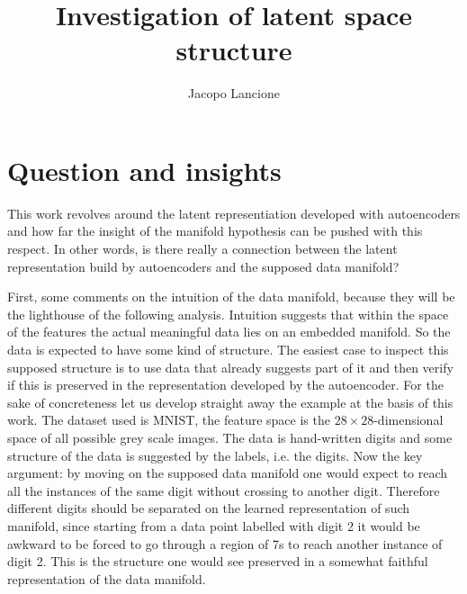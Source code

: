 \documentclass[twocolumn,gsifonts,twoside]{gsipaper}
\begin{document}
\title{\textbf{Investigation of latent space structure}}



\author{Jacopo Lancione}
\address{Università di Torino, jacopo.lancione@edu.unito.it}

\maketitle

\section{Question and insights}
This work revolves around the latent representiation developed with autoencoders and how far the insight of the manifold hypothesis can be pushed with this respect. In other words, is there really a connection between the latent representation build by autoencoders and the supposed data manifold?

First, some comments on the intuition of the data manifold, because they will be the lighthouse of the following analysis. Intuition suggests that within the space of the features the actual meaningful data lies on an embedded manifold. So the data is expected to have some kind of structure. The easiest case to inspect this supposed structure is to use data that already suggests part of it and then verify if this is preserved in the representation developed by the autoencoder. For the sake of concreteness let us develop straight away the example at the basis of this work. The dataset used is MNIST, the feature space is the $28\times28$-dimensional space of all possible grey scale images. The data is hand-written digits and some structure of the data is suggested by the labels, i.e. the digits. Now the key argument: by moving on the supposed data manifold one would expect to reach all the instances of the same digit without crossing to another digit. Therefore different digits should be separated on the learned representation of such manifold, since starting from a data point labelled with digit 2 it would be awkward to be forced to go through a region of 7s to reach another instance of digit 2. This is the structure one would see preserved in a somewhat faithful representation of the data manifold.
\end{document}
